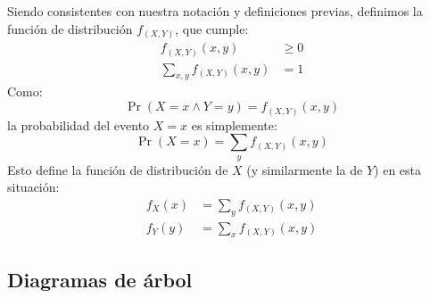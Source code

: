   Siendo consistentes con nuestra notación y definiciones previas,
  definimos la función de distribución \(f_{(X, Y)}\),
  que cumple:
  \begin{align*}
    f_{(X, Y)}(x, y)
      &\ge 0 \\
    \sum_{x, y} f_{(X, Y)}(x, y)
      &=   1
  \end{align*}
  Como:
  \begin{equation*}
    \Pr(X = x \wedge Y = y)
      = f_{(X, Y)}(x, y)
  \end{equation*}
  la probabilidad del evento \(X = x\) es simplemente:
  \begin{equation*}
    \Pr(X = x)
      = \sum_y f_{(X, Y)}(x, y)
  \end{equation*}
  Esto define la función de distribución de \(X\)
  (y similarmente la de \(Y\))
  en esta situación:
  \begin{align}
    f_X(x)
      &= \sum_y f_{(X, Y)}(x, y) \label{eq:f_X-from-f_XY} \\
    f_Y(y)
      &= \sum_x f_{(X, Y)}(x, y) \label{eq:f_Y-from-f_XY}
  \end{align}

\subsection{Diagramas de árbol}
\label{sec:diagramas-arbol}

